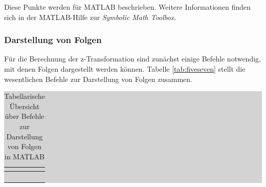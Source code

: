 \noindent  Diese Punkte werden f\"{u}r MATLAB beschrieben. Weitere Informationen finden sich in der MATLAB-Hilfe zur \textit{Symbolic Math Toolbox}.

\subsubsection{Darstellung von Folgen}

\noindent F\"{u}r die Berechnung der z-Transformation sind zun\"{a}chst einige Befehle notwendig, mit denen Folgen dargestellt werden k\"{o}nnen. Tabelle \ref{tab:fiveseven} stellt die wesentlichen Befehle zur Darstellung von Folgen zusammen.


\begin{table}[H]
\setlength{\arrayrulewidth}{.1em}
\caption{Tabellarische \"{U}bersicht \"{u}ber Befehle zur Darstellung von Folgen in MATLAB}
\setlength{\fboxsep}{0pt}%
\colorbox{lightgray}{%
%
\begin{tabular}{| c | c |}
\hline
\parbox[c][0.35in][c]{1.5in}{\smallskip\centering\textbf{\selectfont{Befehl}}} & \parbox[c][0.35in][c]{5in}{\smallskip\centering\textbf{\selectfont{Beschreibung}}}\\ \hline

\parbox[c][0.8in][c]{1.5in}{} & 
\parbox[c][0.8in][c]{5in}{}\\ \hline

\parbox[c][0.4in][c]{1.5in}{} & 
\parbox[c][0.4in][c]{5in}{}\\ \hline

\parbox[c][0.8in][c]{1.5in}{} & 
\parbox[c][0.8in][c]{5in}{}\\ \hline

\parbox[c][0.4in][c]{1.5in}{} & 
\parbox[c][0.4in][c]{5in}{}\\ \hline


\end{tabular}}
\end{table}
